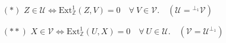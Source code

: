 \documentclass[preview]{standalone}
\begin{document}
\begin{center}
\begin{itemize} \item[$(\ast)$] $Z\in\mathcal{U} \Leftrightarrow \text{Ext}^1_\mathbb{Z}(Z,V)=0 \quad \forall \ V\in\mathcal{V}. \quad (\mathcal{U} = {}^{\perp_1}\mathcal{V})$ \item[$(\ast\ast)$] $X\in\mathcal{V} \Leftrightarrow \text{Ext}^1_\mathbb{Z}(U,X)=0 \quad \forall \ U\in\mathcal{U}. \quad (\mathcal{V} = \mathcal{U}^{\perp_1} )$ \end{itemize}
\end{center}
\end{document}
